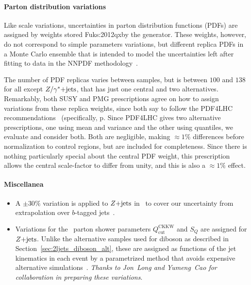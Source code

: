 \paragraph{Parton distribution variations}
Like scale variations, uncertainties in parton distribution functions (PDFs)
are assigned by weights stored Fuks:2012qxby the generator.
These weights, however, do not correspond to simple parameters variations,
but different replica PDFs in a Monte Carlo ensemble
that is intended to model the uncertainties left after fitting to data
in the NNPDF methodology~\cite{NNPDF:2017mvq,BALL2011112,BALL2012608}.

The number of PDF replicas varies between samples, but is between
$100$ and $138$ for all except $Z/\gamma^*\mathrm{+jets}$, that has just one central and two
alternatives.
Remarkably, both SUSY and PMG prescriptions agree on how to assign variations
from these replica weights, since both say to follow the PDF4LHC
recommendations~\cite{PDF4LHC_Butterworth_2016} (specifically, p.
Since PDF4LHC gives two alternative prescriptions, one using mean and variance
and the other using quantiles, we evaluate and consider both.
Both are negligible, making $\approx 1\%$ differences before normalization
to control regions, but are included for completeness.
Since there is nothing particularly special about the central PDF weight,
this prescription allows the central scale-factor to differ from unity,
and this is also a $\approx 1\%$ effect.

\paragraph{Miscellanea}
\begin{itemize}
\item A $\pm30\%$ variation is applied to $Z\mathrm{+jets}$ in \crtt\ to cover our
uncertainty from extrapolation over $b$-tagged
jets~\cite{atlas_twiki_susytheoretical}.
\item Variations for the \sherpa\ parton shower parameters
$Q_\textrm{cut}^\textrm{CKKW}$ and
$S_Q$ are assigned for $Z\mathrm{+jets}$.
Unlike the alternative samples used for diboson as described in
Section~\ref{sec:2ljets_diboson_alt}, these are assigned as functions of the
jet kinematics in each event by a parametrized method that avoids expensive
alternative simulations~\cite{Anders:2125718, atlas_twiki_susytheoretical}.
\emph{Thanks to Jon~Long and Yumeng~Cao for collaboration in preparing these
variations}.
\end{itemize}

